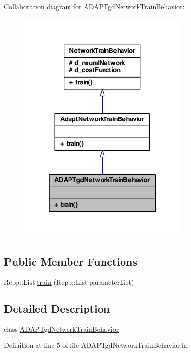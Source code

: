 Collaboration diagram for ADAPTgdNetworkTrainBehavior:
\nopagebreak
\begin{figure}[H]
\begin{center}
\leavevmode
\includegraphics[width=244pt]{class_a_d_a_p_tgd_network_train_behavior__coll__graph}
\end{center}
\end{figure}
\subsection*{Public Member Functions}
\begin{DoxyCompactItemize}
\item 
Rcpp::List \hyperlink{class_a_d_a_p_tgd_network_train_behavior_ac63b24253552d7c84a67716655def3b0}{train} (Rcpp::List parameterList)
\end{DoxyCompactItemize}


\subsection{Detailed Description}
class \hyperlink{class_a_d_a_p_tgd_network_train_behavior}{ADAPTgdNetworkTrainBehavior} -\/ 

Definition at line 5 of file ADAPTgdNetworkTrainBehavior.h.



